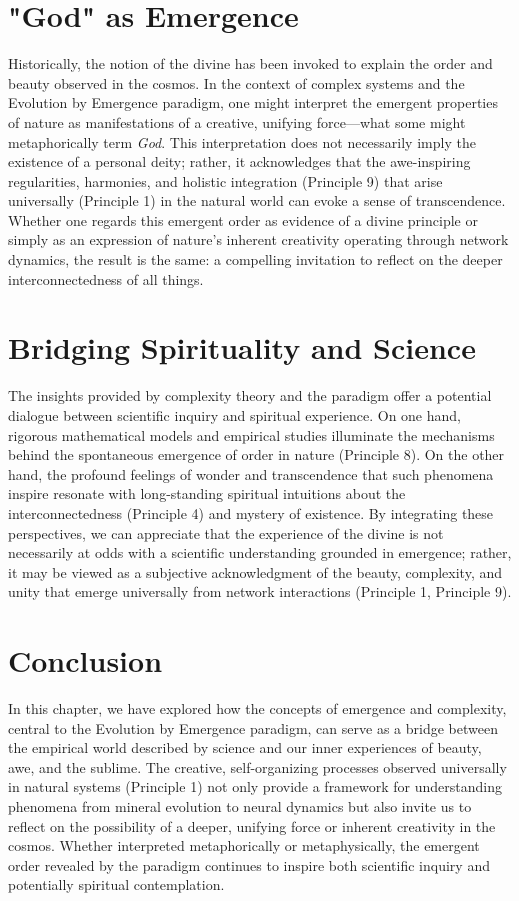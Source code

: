 \section{"God" as Emergence}
Historically, the notion of the divine has been invoked to explain the order and beauty observed in the cosmos. In the context of complex systems and the Evolution by Emergence paradigm, one might interpret the emergent properties of nature as manifestations of a creative, unifying force—what some might metaphorically term \emph{God}. This interpretation does not necessarily imply the existence of a personal deity; rather, it acknowledges that the awe-inspiring regularities, harmonies, and holistic integration (Principle 9) that arise universally (Principle 1) in the natural world can evoke a sense of transcendence. Whether one regards this emergent order as evidence of a divine principle or simply as an expression of nature's inherent creativity operating through network dynamics, the result is the same: a compelling invitation to reflect on the deeper interconnectedness of all things. %

\section{Bridging Spirituality and Science}
The insights provided by complexity theory and the paradigm offer a potential dialogue between scientific inquiry and spiritual experience. On one hand, rigorous mathematical models and empirical studies illuminate the mechanisms behind the spontaneous emergence of order in nature (Principle 8). On the other hand, the profound feelings of wonder and transcendence that such phenomena inspire resonate with long-standing spiritual intuitions about the interconnectedness (Principle 4) and mystery of existence. By integrating these perspectives, we can appreciate that the experience of the divine is not necessarily at odds with a scientific understanding grounded in emergence; rather, it may be viewed as a subjective acknowledgment of the beauty, complexity, and unity that emerge universally from network interactions (Principle 1, Principle 9). %

\section{Conclusion}
In this chapter, we have explored how the concepts of emergence and complexity, central to the Evolution by Emergence paradigm, can serve as a bridge between the empirical world described by science and our inner experiences of beauty, awe, and the sublime. The creative, self-organizing processes observed universally in natural systems (Principle 1) not only provide a framework for understanding phenomena from mineral evolution to neural dynamics but also invite us to reflect on the possibility of a deeper, unifying force or inherent creativity in the cosmos. Whether interpreted metaphorically or metaphysically, the emergent order revealed by the paradigm continues to inspire both scientific inquiry and potentially spiritual contemplation. %
\cleardoublepage
